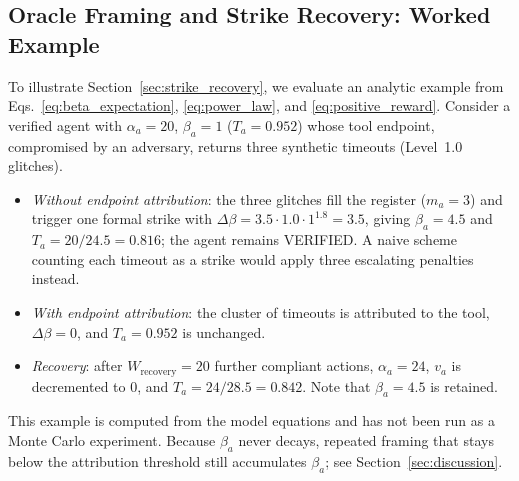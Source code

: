 \documentclass[journal]{IEEEtran}
\begin{document}
\subsection{Oracle Framing and Strike Recovery: Worked Example}
To illustrate Section~\ref{sec:strike_recovery}, we evaluate an analytic example from Eqs.~\eqref{eq:beta_expectation}, \eqref{eq:power_law}, and \eqref{eq:positive_reward}. Consider a verified agent with $\alpha_a = 20$, $\beta_a = 1$ ($T_a = 0.952$) whose tool endpoint, compromised by an adversary, returns three synthetic timeouts (Level~1.0 glitches).
\begin{itemize}[leftmargin=12pt, topsep=2pt, itemsep=1pt]
\item \emph{Without endpoint attribution}: the three glitches fill the register ($m_a = 3$) and trigger one formal strike with $\Delta\beta = 3.5 \cdot 1.0 \cdot 1^{1.8} = 3.5$, giving $\beta_a = 4.5$ and $T_a = 20/24.5 = 0.816$; the agent remains VERIFIED. A naive scheme counting each timeout as a strike would apply three escalating penalties instead.
\item \emph{With endpoint attribution}: the cluster of timeouts is attributed to the tool, $\Delta\beta = 0$, and $T_a = 0.952$ is unchanged.
\item \emph{Recovery}: after $W_{\text{recovery}} = 20$ further compliant actions, $\alpha_a = 24$, $v_a$ is decremented to 0, and $T_a = 24/28.5 = 0.842$. Note that $\beta_a = 4.5$ is retained.
\end{itemize}
This example is computed from the model equations and has not been run as a Monte Carlo experiment. Because $\beta_a$ never decays, repeated framing that stays below the attribution threshold still accumulates $\beta_a$; see Section~\ref{sec:discussion}.
\end{document}
